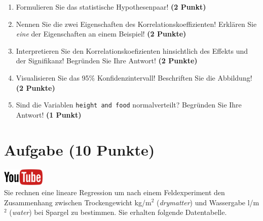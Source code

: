 \documentclass[a4paper, 9pt]{scrartcl}\usepackage[]{graphicx}\usepackage[]{xcolor}
\begin{document}
\begin{enumerate}
  \item Formulieren Sie das statistische Hypothesenpaar! \textbf{(2
Punkt)}
\item Nennen Sie die zwei Eigenschaften des Korrelationskoeffizienten!
  Erkl{\"a}ren Sie \textit{eine} der Eigenschaften an einem Beispiel! \textbf{(2
    Punkte)}
\item Interpretieren Sie den Korrelationskoefizienten hinsichtlich des
  Effekts und der Signifikanz! Begr{\"u}nden Sie
  Ihre Antwort! \textbf{(2 Punkte)}
\item Visualisieren Sie das 95\% Konfidenzintervall! Beschriften Sie die Abbildung! \textbf{(2 Punkte)} 
\item Sind die Variablen \texttt{height and food} normalverteilt?
  Begr{\"u}nden Sie Ihre Antwort! \textbf{(1 Punkt)}
\end{enumerate} 
\clearpage

\section{Aufgabe \hfill (10 Punkte)}

\hfill\href{https://youtu.be/dyQlYV9nOqY}{\includegraphics[width =
  2cm]{img/youtube}}\\[1Ex]

Sie rechnen eine lineare Regression um nach einem Feldexperiment den
Zusammenhang zwischen Trockengewicht kg/m$^2$ (\textit{drymatter}) und
Wassergabe l/m$^2$ (\textit{water}) bei Spargel zu bestimmen. Sie erhalten
folgende Datentabelle.
\end{document}
